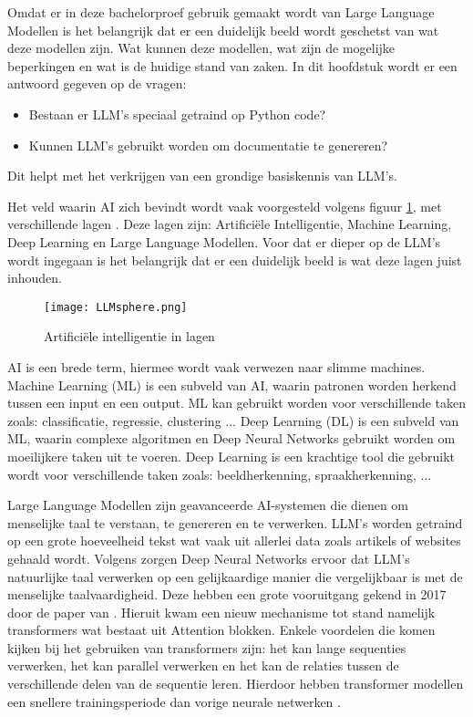 Omdat er in deze bachelorproef gebruik gemaakt wordt van Large Language Modellen is het belangrijk dat er een duidelijk beeld wordt geschetst van wat deze modellen zijn.
Wat kunnen deze modellen, wat zijn de mogelijke beperkingen en wat is de huidige stand van zaken. 
In dit hoofdstuk wordt er een antwoord gegeven op de vragen: 
\begin{itemize}
  \item Bestaan er LLM's speciaal getraind op Python code? 
  \item Kunnen LLM's gebruikt worden om documentatie te genereren?
\end{itemize}
Dit helpt met het verkrijgen van een grondige basiskennis van LLM's. 

Het veld waarin AI zich bevindt wordt vaak voorgesteld volgens figuur \ref{fig:LLM-position}, met verschillende lagen \autocite{Stoeffelbauer2023}.
Deze lagen zijn: Artificiële Intelligentie, Machine Learning, Deep Learning en Large Language Modellen.
Voor dat er dieper op de LLM's wordt ingegaan is het belangrijk dat er een duidelijk beeld is wat deze lagen juist inhouden.

\begin{figure}[h]
  \centering
  \texttt{[image: LLMsphere.png]}
  \caption{Artificiële intelligentie in lagen \autocite{Stoeffelbauer2023}}
  \label{fig:LLM-position}
\end{figure}

AI is een brede term, hiermee wordt vaak verwezen naar slimme machines. 
Machine Learning (ML) is een subveld van AI, waarin patronen worden herkend tussen een input en een output.
ML kan gebruikt worden voor verschillende taken zoals: classificatie, regressie, clustering ...
Deep Learning (DL) is een subveld van ML, waarin complexe algoritmen en Deep Neural Networks gebruikt worden om moeilijkere taken uit te voeren.
Deep Learning is een krachtige tool die gebruikt wordt voor verschillende taken zoals: beeldherkenning, spraakherkenning, ... \autocite{Stoeffelbauer2023}

Large Language Modellen zijn geavanceerde AI-systemen die dienen om menselijke taal te verstaan, te genereren en te verwerken.
LLM's worden getraind op een grote hoeveelheid tekst wat vaak uit allerlei data zoals artikels of websites gehaald wordt. 
Volgens \textcite{Beelen2023} zorgen Deep Neural Networks ervoor dat LLM's natuurlijke taal verwerken op een gelijkaardige manier die vergelijkbaar is met de menselijke taalvaardigheid.
Deze hebben een grote vooruitgang gekend in 2017 door de paper van \textcite{VaswaniEtAl2017}. 
Hieruit kwam een nieuw mechanisme tot stand namelijk transformers wat bestaat uit Attention blokken. 
Enkele voordelen die komen kijken bij het gebruiken van transformers zijn: het kan lange sequenties verwerken, het kan parallel verwerken en het kan de relaties tussen de verschillende delen van de sequentie leren.
Hierdoor hebben transformer modellen een snellere trainingsperiode dan vorige neurale netwerken \autocite{aiml2023}.

